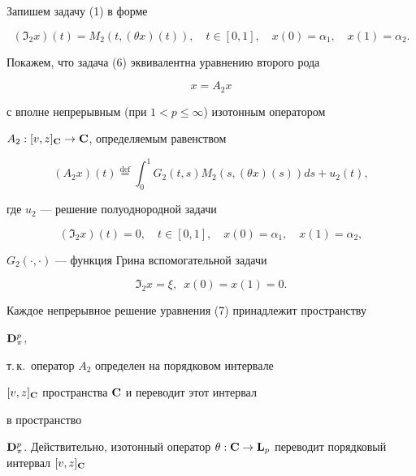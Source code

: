 \begin{pf} Запишем задачу (1) в форме


\begin{equation}


({\Im}_2x)(t)=


M_2(t,(\theta x)(t)),\quad


t\in[0,1],\quad x(0)=\alpha_1, \quad x(1)=\alpha_2.


\end{equation}


Покажем, что задача (6) эквивалентна уравнению второго рода


\begin{equation}


x=A_2x


\end{equation}


с вполне непрерывным (при $1<p\le\infty$) изотонным оператором


$A_2:[v,z]_{\bold C}\to{\bold C}$, определяемым равенством


$$


(A_2x)(t)


\overset{\mathrm{def}}{=}{}


\int_0^1G_2(t,s)M_2(s,(\theta x)(s))ds+u_2(t),


$$


где $u_2$ --- решение полуоднородной задачи


$$


({\Im}_2x)(t)=0, \quad t\in[0,1],\quad x(0)=\alpha_1, \quad x(1)=\alpha_2,


$$


$G_2(\cdot,\cdot)$ --- функция Грина вспомогательной задачи


\begin{equation}


{\Im}_2x=\xi,\ \; x(0)=x(1)=0.


\end{equation}


Каждое непрерывное решение уравнения (7) принадлежит пространству


$\bold D_\pi^p$,


т.\,к.~оператор $A_2$ определен на порядковом интервале


$[v,z]_{\bold C}$ пространства $\bold C$ и переводит этот интервал


в пространство


$\bold D_\pi^p$. Действительно, изотонный оператор $\theta:\bold C


\to\bold L_p$ переводит порядковый интервал $[v,z]_{\bold C}$



\end{pf}
